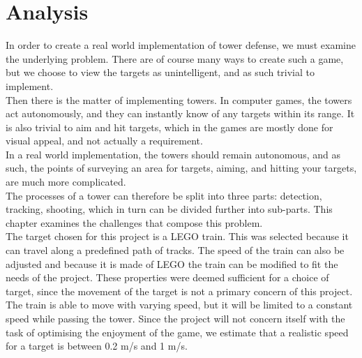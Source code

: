 \chapter{Analysis}\label{ch:analysis}\label{\automlabel}
In order to create a real world implementation of tower defense, we must examine the underlying problem. There are of course many ways to create such a game, but we choose to view the targets as unintelligent, and as such trivial to implement.\\

Then there is the matter of implementing towers. In computer games, the towers act autonomously, and they can instantly know of any targets within its range. It is also trivial to aim and hit targets, which in the games are mostly done for visual appeal, and not actually a requirement. \\

In a real world implementation, the towers should remain autonomous, and as such, the points of surveying an area for targets, aiming, and hitting your targets, are much more complicated. \\

The processes of a tower can therefore be split into three parts: detection, tracking, shooting, which in turn can be divided further into sub-parts. This chapter examines the challenges that compose this problem. \\

The target chosen for this project is a LEGO train. This was selected because it can travel along a predefined path of tracks. The speed of the train can also be adjusted and because it is made of LEGO the train can be modified to fit the needs of the project. These properties were deemed sufficient for a choice of target, since the movement of the target is not a primary concern of this project. The train is able to move with varying speed, but it will be limited to a constant speed while passing the tower. Since the project will not concern itself with the task of optimising the enjoyment of the game, we estimate that a realistic speed for a target is between 0.2 m/s and 1 m/s.




